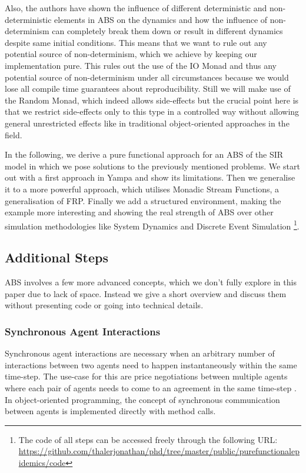 Also, the authors \cite{thaler_art_2017} have shown the influence of different deterministic and non-deterministic elements in ABS on the dynamics and how the influence of non-determinism can completely break them down or result in different dynamics despite same initial conditions. This means that we want to rule out any potential source of non-determinism, which we achieve by keeping our implementation pure. This rules out the use of the IO Monad and thus any potential source of non-determinism under all circumstances because we would lose all compile time guarantees about reproducibility. Still we will make use of the Random Monad, which indeed allows side-effects but the crucial point here is that we restrict side-effects only to this type in a controlled way without allowing general unrestricted effects like in traditional object-oriented approaches in the field.

In the following, we derive a pure functional approach for an ABS of the SIR model in which we pose solutions to the previously mentioned problems. We start out with a first approach in Yampa and show its limitations. Then we generalise it to a more powerful approach, which utilises Monadic Stream Functions, a generalisation of FRP. Finally we add a structured environment, making the example more interesting and showing the real strength of ABS over other simulation methodologies like System Dynamics and Discrete Event Simulation \footnote{The code of all steps can be accessed freely through the following URL: \url{https://github.com/thalerjonathan/phd/tree/master/public/purefunctionalepidemics/code}}.







\subsection{Additional Steps}
ABS involves a few more advanced concepts, which we don't fully explore in this paper due to lack of space. Instead we give a short overview and discuss them without presenting code or going into technical details.

\subsubsection{Synchronous Agent Interactions}
Synchronous agent interactions are necessary when an arbitrary number of interactions between two agents need to happen instantaneously within the same time-step. The use-case for this are price negotiations between multiple agents where each pair of agents needs to come to an agreement in the same time-step \cite{epstein_growing_1996}. In object-oriented programming, the concept of synchronous communication between agents is implemented directly with method calls.

